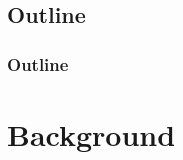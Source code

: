 \documentclass{beamer}
\newcommand{\linespace}{\vskip 0.25cm}
\begin{document}
\subsection*{Outline}

\begin{frame}
  \frametitle{Outline}
  \tableofcontents[hideallsubsections]
\end{frame}

\section[Mobile Security]{Background}


%  
%
%
%
%  


%
%	
%	
%	
%	
%	
%	
%	
\end{document}
